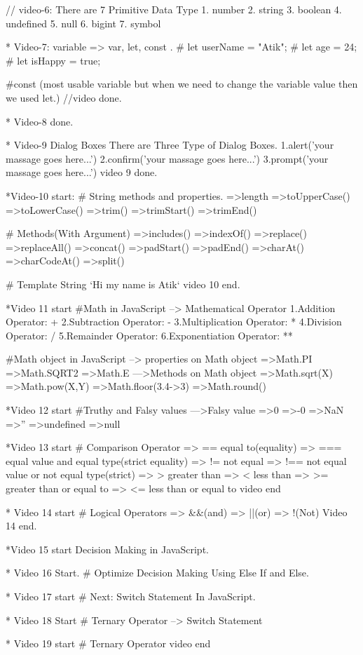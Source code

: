 // video-6: There are 7 Primitive Data Type
1. number
2. string
3. boolean
4. undefined
5. null
6. bigint
7. symbol

* Video-7: 
variable => var, let, const .
# let userName = "Atik";
# let age = 24;
# let isHappy = true;

#const (most usable variable but  when we need to change the variable value then we used let.)
//video done.

* Video-8 done.

* Video-9 
Dialog Boxes
There are Three Type of Dialog Boxes.
1.alert('your massage goes here...')
2.confirm('your massage goes here...')
3.prompt('your massage goes here...')
video 9 done.

*Video-10 start: 
# String methods and properties.
=>length
=>toUpperCase()
=>toLowerCase()
=>trim()
=>trimStart()
=>trimEnd()

# Methods(With Argument)
=>includes()
=>indexOf()
=>replace()
=>replaceAll()
=>concat()
=>padStart()
=>padEnd()
=>charAt()
=>charCodeAt()
=>split()

# Template String 
`Hi my name is Atik`
video 10 end.

*Video 11 start
#Math in JavaScript
--> Mathematical Operator
1.Addition Operator: +
2.Subtraction Operator: -
3.Multiplication Operator: *
4.Division Operator: /
5.Remainder Operator: %
6.Exponentiation Operator: **

#Math object in JavaScript
--> properties on Math object
=>Math.PI 
=>Math.SQRT2
=>Math.E
--->Methods on Math object
=>Math.sqrt(X)
=>Math.pow(X,Y)
=>Math.floor(3.4->3)
=>Math.round()

*Video 12 start
#Truthy and Falsy values
--->Falsy value
=>0
=>-0
=>NaN
=>''
=>undefined
=>null

*Video 13 start
# Comparison Operator
=> == equal to(equality)
=> === equal value and equal type(strict equality)
=> != not equal
=> !== not equal value or not equal type(strict)
=> > greater than
=> < less than
=> >= greater than or equal to 
=> <= less than or equal to
video end

* Video 14 start
# Logical Operators
=> &&(and)
=> ||(or)
=> !(Not)
Video 14 end.

*Video 15 start
Decision Making in JavaScript.

* Video 16 Start.
# Optimize Decision Making Using Else If and Else.

* Video 17 start
# Next: Switch Statement In JavaScript.

* Video 18 Start
# Ternary Operator
--> Switch Statement

* Video 19 start
# Ternary Operator
video end